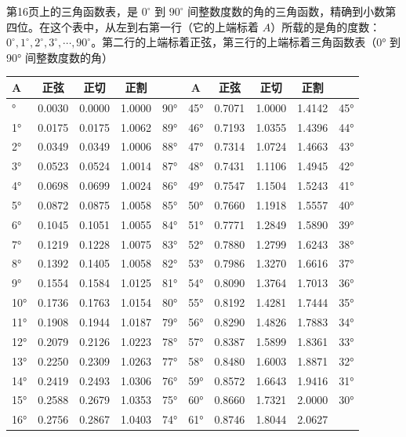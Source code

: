 第16页上的三角函数表，是 \(0^{\circ}\) 到 \(90^{\circ}\)
间整数度数的角的三角函数，精确到小数第四位。在这个表中，从左到右第一行（它的上端标着
\(A\)）所载的是角的度数：\(0^{\circ}, 1^{\circ}, 2^{\circ}, 3^{\circ}, \cdots, 90^{\circ}\)。第二行的上端标着正弦，第三行的上端标着三角函数表（0°
到 90° 间整数度数的角）

{\def\LTcaptype{none}%
\footnotesize\setlength{\tabcolsep}{2.6pt}%
\begin{longtable}[]{@{}lccccccccc@{}}
\toprule
A & 正弦 & 正切 & 正割 &  & A & 正弦 & 正切 & 正割 &  \\
\midrule
\endhead
\bottomrule
\endlastfoot
0° & 0.0030 & 0.0000 & 1.0000 & 90° & 45° & 0.7071 & 1.0000 & 1.4142 &
45° \\
1° & 0.0175 & 0.0175 & 1.0062 & 89° & 46° & 0.7193 & 1.0355 & 1.4396 &
44° \\
2° & 0.0349 & 0.0349 & 1.0006 & 88° & 47° & 0.7314 & 1.0724 & 1.4663 &
43° \\
3° & 0.0523 & 0.0524 & 1.0014 & 87° & 48° & 0.7431 & 1.1106 & 1.4945 &
42° \\
4° & 0.0698 & 0.0699 & 1.0024 & 86° & 49° & 0.7547 & 1.1504 & 1.5243 &
41° \\
5° & 0.0872 & 0.0875 & 1.0058 & 85° & 50° & 0.7660 & 1.1918 & 1.5557 &
40° \\
6° & 0.1045 & 0.1051 & 1.0055 & 84° & 51° & 0.7771 & 1.2849 & 1.5890 &
39° \\
7° & 0.1219 & 0.1228 & 1.0075 & 83° & 52° & 0.7880 & 1.2799 & 1.6243 &
38° \\
8° & 0.1392 & 0.1405 & 1.0058 & 82° & 53° & 0.7986 & 1.3270 & 1.6616 &
37° \\
9° & 0.1554 & 0.1584 & 1.0125 & 81° & 54° & 0.8090 & 1.3764 & 1.7013 &
36° \\
10° & 0.1736 & 0.1763 & 1.0154 & 80° & 55° & 0.8192 & 1.4281 & 1.7444 &
35° \\
11° & 0.1908 & 0.1944 & 1.0187 & 79° & 56° & 0.8290 & 1.4826 & 1.7883 &
34° \\
12° & 0.2079 & 0.2126 & 1.0223 & 78° & 57° & 0.8387 & 1.5899 & 1.8361 &
33° \\
13° & 0.2250 & 0.2309 & 1.0263 & 77° & 58° & 0.8480 & 1.6003 & 1.8871 &
32° \\
14° & 0.2419 & 0.2493 & 1.0306 & 76° & 59° & 0.8572 & 1.6643 & 1.9416 &
31° \\
15° & 0.2588 & 0.2679 & 1.0353 & 75° & 60° & 0.8660 & 1.7321 & 2.0000 &
30° \\
16° & 0.2756 & 0.2867 & 1.0403 & 74° & 61° & 0.8746 & 1.8044 & 2.0627 &

\end{longtable}}
